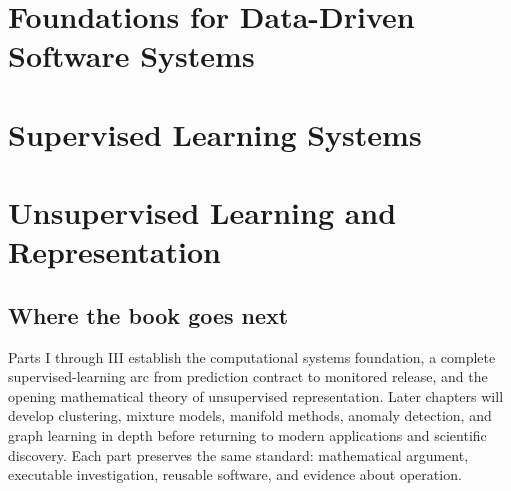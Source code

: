 \documentclass[11pt,letterpaper,openany]{book}
\begin{document}
\frontmatter


\tableofcontents

\mainmatter
\part{Foundations for Data-Driven Software Systems}










\part{Supervised Learning Systems}

















\part{Unsupervised Learning and Representation}



\appendix





\backmatter
\chapter*{Where the book goes next}
Parts I through III establish the computational systems foundation, a complete
supervised-learning arc from prediction contract to monitored release, and the
opening mathematical theory of unsupervised representation. Later chapters will
develop clustering, mixture models, manifold methods, anomaly detection, and
graph learning in depth before returning to modern applications and scientific
discovery. Each part preserves the same standard: mathematical argument,
executable investigation, reusable software, and evidence about operation.

\printindex
\end{document}
